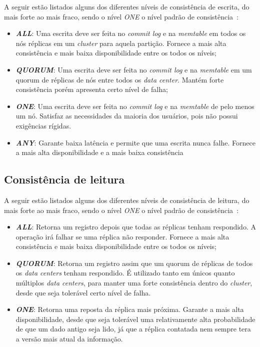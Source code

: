 A seguir estão listados alguns dos diferentes níveis de consistência de escrita, do mais forte ao mais fraco, sendo o nível \emph{ONE} o nível padrão de consistência~\cite{cassandradocs}:

\begin{itemize}

\item \textbf{\emph{ALL}}: Uma escrita deve ser feita no \emph{commit log} e na \emph{memtable} em todos os nós réplicas em um \emph{cluster} para aquela partição. Fornece a mais alta consistência e mais baixa disponibilidade entre os todos os níveis; 

\item \textbf{\emph{QUORUM}}: Uma escrita deve ser feita no \emph{commit log} e na \emph{memtable} em um quorum de réplicas de nós entre todos os \emph{data center}. Mantém forte consistência porém apresenta certo nível de falha;

\item \textbf{\emph{ONE}}: Uma escrita deve ser feita no \emph{commit log} e na \emph{memtable} de pelo menos um nó. Satisfaz as necessidades da maioria dos usuários, pois não possui exigências rígidas.

\item \textbf{\emph{ANY}}: Garante baixa latência e permite que uma escrita nunca falhe. Fornece a mais alta disponibilidade e a mais baixa consistência

\end{itemize}

\subsection*{Consistência de leitura}

A seguir estão listados alguns dos diferentes níveis de consistência de leitura, do mais forte ao mais fraco, sendo o nível \emph{ONE} o nível padrão de consistência~\cite{cassandradocs}:

\begin{itemize}

\item \textbf{\emph{ALL}}: Retorna um registro depois que todas as réplicas tenham respondido. A operação irá falhar se uma réplica não responder. Fornece a mais alta consistência e mais baixa disponibilidade entre os todos os níveis; 

\item \textbf{\emph{QUORUM}}: Retorna um registro assim que um quorum de réplicas de todos os \emph{data centers} tenham respondido. É utilizado tanto em únicos quanto múltiplos \emph{data centers}, para manter uma forte consistência dentro do \emph{cluster}, desde que seja tolerável certo nível de falha.

\item \textbf{\emph{ONE}}: Retorna uma reposta da réplica mais próxima. Garante a mais alta disponibilidade, desde que seja tolerável uma relativamente alta probabilidade de que um dado antigo seja lido, já que a réplica contatada nem sempre tera a versão mais atual da informação.

\end{itemize}


